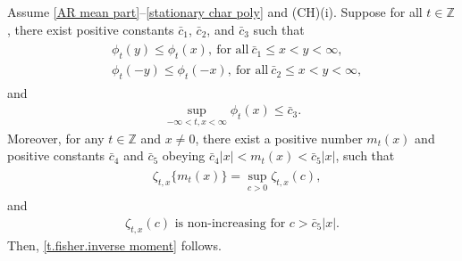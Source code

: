 \documentclass[10pt,a4paper]{amsart}
\begin{document}
\begin{theorem}\label{tfisherS}
{Assume \eqref{AR mean part}--\eqref{stationary char poly} and {\rm (CH)(i)}}. Suppose for all $t \in \mathbb{Z}$, there exist positive constants $\bar{c}_1$, $\bar{c}_2$, and $\bar{c}_3$ such that
\begin{align}\label{zt densityS}
\begin{split}
& \phi_t(y)\leq \phi_t(x),\ \textrm{for all}\  \bar{c}_1\leq x< y<\infty,\\
& \phi_t(-y)\leq \phi_{t}(-x),\ \textrm{for all}\  \bar{c}_2\leq x< y<\infty,
\end{split}
\end{align}
and
\begin{eqnarray}
\label{ing104S}
\sup_{-\infty<t,x<\infty}\phi_t(x)\leq \bar{c}_3.
\end{eqnarray}
Moreover, for any $t\in \mathbb{Z}$ and $x\neq0$, there exist a positive number $m_t(x)$ and positive constants $\bar{c}_4$ and $\bar{c}_5$ obeying $\bar{c}_4|x| < m_t(x)< \bar{c}_5|x|$, such that
\begin{align}
\begin{split}
\label{zt density 0S}
& \zeta_{t,x}\{m_t(x)\}=\sup_{c>0} \zeta_{t,x}(c),
\end{split}
\end{align}
and 
\begin{equation}
\label{zt density 2S}
\begin{split}
\zeta_{t,x}(c) \,\,\mbox{is non-increasing for} \,\,
c>\bar{c}_5|x|.
\end{split}
\end{equation}
Then,
\eqref{t.fisher.inverse moment} follows.
\end{theorem}
\end{document}
